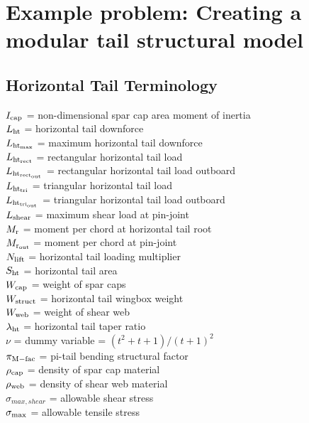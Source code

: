 \section{Example problem: Creating a modular tail structural model}

\subsection{Horizontal Tail Terminology}
\begin{tabbing}
$I_{\rm{cap}}$ = non-dimensional spar cap area moment of inertia \\
$L_{\rm{ht}}$ = horizontal tail downforce \\
$L_{\rm{ht}_{\rm{max}}}$ = maximum horizontal tail downforce \\
$L_{\rm{ht}_{rect}}$ = rectangular horizontal tail load \\
$L_{\rm{ht}_{\rm{rect}_{\rm{out}}}}$ = rectangular horizontal tail load outboard\\
$L_{\rm{ht}_{\rm{tri}}}$ = triangular horizontal tail load \\
$L_{\rm{ht}_{tri_{\rm{out}}}}$ = triangular horizontal tail load outboard\\
$L_{\rm{shear}}$ = maximum shear load at pin-joint\\
$M_{\rm{r}}$ = moment per chord at horizontal tail root \\
$M_{\rm{r}_{\rm{out}}}$ = moment per chord at pin-joint\\
$N_{\rm{lift}}$ = horizontal tail loading multiplier \\
$S_{\rm{ht}}$ = horizontal tail area \\
$W_{\rm{cap}}$ = weight of spar caps \\
$W_{\rm{struct}}$ = horizontal tail wingbox weight \\
$W_{\rm{web}}$ = weight of shear web \\
$\lambda_{\rm{ht}}$ = horizontal tail taper ratio \\
$\nu$ = dummy variable = $(t^2 + t + 1)/(t+1)^2$ \\
$\pi_{\rm{M-fac}}$ = pi-tail bending structural factor \\
$\rho_{\rm{cap}}$ = density of spar cap material \\
$\rho_{\rm{web}}$ = density of shear web material \\
$\sigma_{max,shear}$ = allowable shear stress \\
$\sigma_{\rm{max}}$ = allowable tensile stress \\

\end{tabbing}
